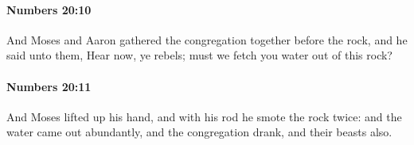 		\paragraph{Numbers 20:10} %
			\label{NUMBERS-20-10}

			And Moses and Aaron gathered the congregation together before the rock, and he said unto them, Hear now, ye rebels; must we fetch you water out of this rock?


		\paragraph{Numbers 20:11} %
			\label{NUMBERS-20-11}

			And Moses lifted up his hand, and with his rod he smote the rock twice: and the water came out abundantly, and the congregation drank, and their beasts also.


